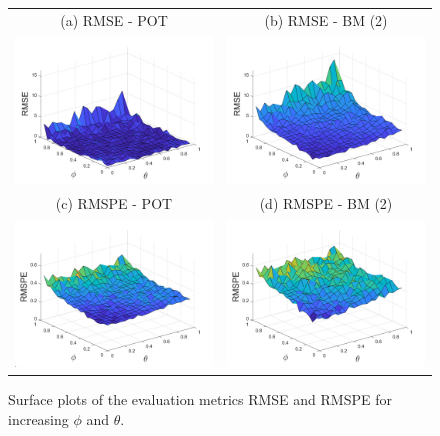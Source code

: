 \documentclass[a4paper,12pt]{article}
\theoremstyle{plain}
\begin{document}
\begin{figure}[H]
\begin{tabular}{cc}
(a) RMSE - POT & (b) RMSE - BM (2) \\[6pt]
  \includegraphics[width=80mm]{Figures/results_rmse_arma_pothill.jpg} &   \includegraphics[width=80mm]{Figures/results_rmse_arma_bm2.jpg} \\
  (c) RMSPE - POT & (d) RMSPE - BM (2) \\[6pt]
  \includegraphics[width=80mm]{Figures/results_mape_arma_pothill.jpg} &   \includegraphics[width=80mm]{Figures/results_mape_arma_bm2.jpg} \\
\end{tabular}
\vspace{-0.8cm}
\captionsetup[figure]{font=small,labelfont=small}
\caption{Surface plots of the evaluation metrics RMSE and RMSPE for increasing $\phi$ and $\theta$. }
\label{fig:results_arma_surfaces}
\end{figure}
\end{document}
